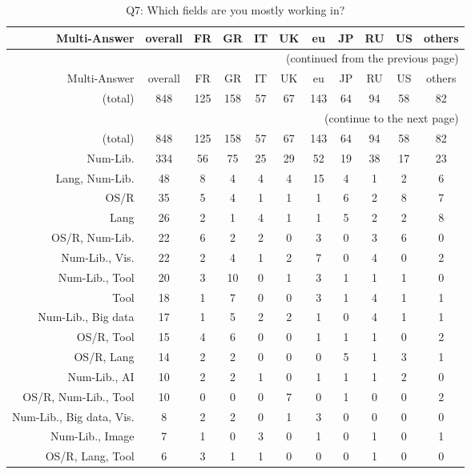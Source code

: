 \clearpage%
{\footnotesize\begin{landscape}%
\begin{longtable}[htb]{r|c|c|c|c|c|c|c|c|c|c}%
\caption{Q7: Which fields are you mostly working in?}%
\label{tab:Q7-mans} \\%
\hline%
Multi-Answer & overall & FR & GR & IT & UK & eu & JP & RU & US & others \\
 \hline%
\endfirsthead%
\multicolumn{11}{r}{(continued from the previous page)}\\%
\hline%
Multi-Answer & overall & FR & GR & IT & UK & eu & JP & RU & US & others \\
 \hline%
\endhead%
\hline%
(total) & 848 & 125 & 158 & 57 & 67 & 143 & 64 & 94 & 58 & 82 \\%
\hline%
\multicolumn{11}{r}{(continue to the next page)}\\%
\endfoot%
\hline%
(total) & 848 & 125 & 158 & 57 & 67 & 143 & 64 & 94 & 58 & 82 \\%
\hline%
\endlastfoot%
\hline%
{Num-Lib.} & 334 & 56 & 75 & 25 & 29 & 52 & 19 & 38 & 17 & 23 \\%
{Lang, Num-Lib.} & 48 & 8 & 4 & 4 & 4 & 15 & 4 & 1 & 2 & 6 \\%
{OS/R} & 35 & 5 & 4 & 1 & 1 & 1 & 6 & 2 & 8 & 7 \\%
{Lang} & 26 & 2 & 1 & 4 & 1 & 1 & 5 & 2 & 2 & 8 \\%
{OS/R, Num-Lib.} & 22 & 6 & 2 & 2 & 0 & 3 & 0 & 3 & 6 & 0 \\%
{Num-Lib., Vis.} & 22 & 2 & 4 & 1 & 2 & 7 & 0 & 4 & 0 & 2 \\%
{Num-Lib., Tool} & 20 & 3 & 10 & 0 & 1 & 3 & 1 & 1 & 1 & 0 \\%
{Tool} & 18 & 1 & 7 & 0 & 0 & 3 & 1 & 4 & 1 & 1 \\%
{Num-Lib., Big data} & 17 & 1 & 5 & 2 & 2 & 1 & 0 & 4 & 1 & 1 \\%
{OS/R, Tool} & 15 & 4 & 6 & 0 & 0 & 1 & 1 & 1 & 0 & 2 \\%
{OS/R, Lang} & 14 & 2 & 2 & 0 & 0 & 0 & 5 & 1 & 3 & 1 \\%
{Num-Lib., AI} & 10 & 2 & 2 & 1 & 0 & 1 & 1 & 1 & 2 & 0 \\%
{OS/R, Num-Lib., Tool} & 10 & 0 & 0 & 0 & 7 & 0 & 1 & 0 & 0 & 2 \\%
{Num-Lib., Big data, Vis.} & 8 & 2 & 2 & 0 & 1 & 3 & 0 & 0 & 0 & 0 \\%
{Num-Lib., Image} & 7 & 1 & 0 & 3 & 0 & 1 & 0 & 1 & 0 & 1 \\%
{OS/R, Lang, Tool} & 6 & 3 & 1 & 1 & 0 & 0 & 0 & 1 & 0 & 0 \\%

\end{longtable}
\end{landscape}}
